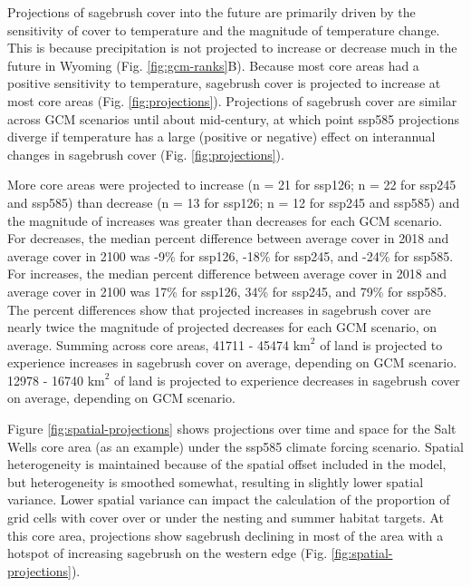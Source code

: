 \documentclass[
  12pt,
]{article}
\begin{document}
Projections of sagebrush cover into the future are primarily driven by the sensitivity of cover to temperature and the magnitude of temperature change.
This is because precipitation is not projected to increase or decrease much in the future in Wyoming (Fig. \ref{fig:gcm-ranks}B).
Because most core areas had a positive sensitivity to temperature, sagebrush cover is projected to increase at most core areas (Fig. \ref{fig:projections}).
Projections of sagebrush cover are similar across GCM scenarios until about mid-century, at which point ssp585 projections diverge if temperature has a large (positive or negative) effect on interannual changes in sagebrush cover (Fig. \ref{fig:projections}).

More core areas were projected to increase (n = 21 for ssp126; n = 22 for ssp245 and ssp585) than decrease (n = 13 for ssp126; n = 12 for ssp245 and ssp585) and the magnitude of increases was greater than decreases for each GCM scenario.
For decreases, the median percent difference between average cover in 2018 and average cover in 2100 was -9\% for ssp126, -18\% for ssp245, and -24\% for ssp585.
For increases, the median percent difference between average cover in 2018 and average cover in 2100 was 17\% for ssp126, 34\% for ssp245, and 79\% for ssp585.
The percent differences show that projected increases in sagebrush cover are nearly twice the magnitude of projected decreases for each GCM scenario, on average.
Summing across core areas, 41711 - 45474 \(\text{km}^2\) of land is projected to experience increases in sagebrush cover on average, depending on GCM scenario.
12978 - 16740 \(\text{km}^2\) of land is projected to experience decreases in sagebrush cover on average, depending on GCM scenario.

Figure \ref{fig:spatial-projections} shows projections over time and space for the Salt Wells core area (as an example) under the ssp585 climate forcing scenario.
Spatial heterogeneity is maintained because of the spatial offset included in the model, but heterogeneity is smoothed somewhat, resulting in slightly lower spatial variance.
Lower spatial variance can impact the calculation of the proportion of grid cells with cover over or under the nesting and summer habitat targets.
At this core area, projections show sagebrush declining in most of the area with a hotspot of increasing sagebrush on the western edge (Fig. \ref{fig:spatial-projections}).
\end{document}
